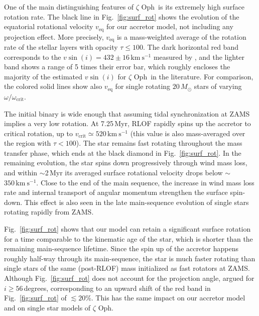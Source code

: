 \documentclass[twocolumn,twocolappendix,trackchanges]{aastex63}
\newcommand{\kms}{{\mathrm{km\ s^{-1}}}}
\DeclareRobustCommand{\Figref}[1]{Fig.~\ref{#1}}
\newcommand{\zoph}{$\zeta$ Oph}
\begin{document}
One of the main distinguishing features of \zoph\ is its extremely
high surface rotation rate.
The black line in \Figref{fig:surf_rot} shows the evolution of the
equatorial rotational velocity $v_\mathrm{eq}$ for our accretor model,
not including any projection effect. More precisely, $v_\mathrm{eq}$
is a mass-weighted average of the rotation rate of the stellar layers
with opacity $\tau\leq 100$. The dark horizontal red band corresponds
to the $v\sin(i)=432\pm16\,\kms$ measured by \cite{zehe:18}, and the
lighter band shows a range of 5 times their error bar, which roughly
encloses the majority of the estimated $v\sin(i)$ for \zoph\ in the
literature.  For comparison, the colored solid lines show also
$v_\mathrm{eq}$ for single rotating $20\,M_\odot$ stars of varying
$\omega/\omega_\mathrm{crit}$.

The initial binary is wide enough that assuming tidal synchronization
at ZAMS implies a very low rotation. At 7.25\,Myr, RLOF rapidly spins
up the accretor to critical rotation, up to
$v_\mathrm{crit}\simeq520\,\kms$ (this value is also mass-averaged
over the region with $\tau<100$). The star remains fast rotating
throughout the mass transfer phase, which ends at the black diamond in
\Figref{fig:surf_rot}. In the remaining evolution, the star spins down
progressively through wind mass loss, and within $\sim$2\,Myr its
averaged surface rotational velocity drops below
$\sim$$350\,\kms$. Close to the end of the main sequence, the increase in wind mass loss rate and internal transport of angular momentum strengthen the surface spin-down. This effect is also seen in the late main-sequence evolution of single stars rotating rapidly from ZAMS.

\Figref{fig:surf_rot} shows that our model can retain a significant surface rotation for a time comparable to the kinematic age of the star, which is shorter than the remaining main-sequence lifetime. Since the spin up of the accretor happens roughly half-way through its main-sequence, the star is much faster rotating than single stars of the same (post-RLOF) mass initialized as fast rotators at ZAMS. Although \Figref{fig:surf_rot} does not account for the projection angle, \cite{zehe:18} argued for
$i\geq56$\,degrees, corresponding to an upward shift of the red band in \Figref{fig:surf_rot} of $\lesssim
20\%$. This has the same impact on our accretor model and on single star models of \zoph.
\end{document}
